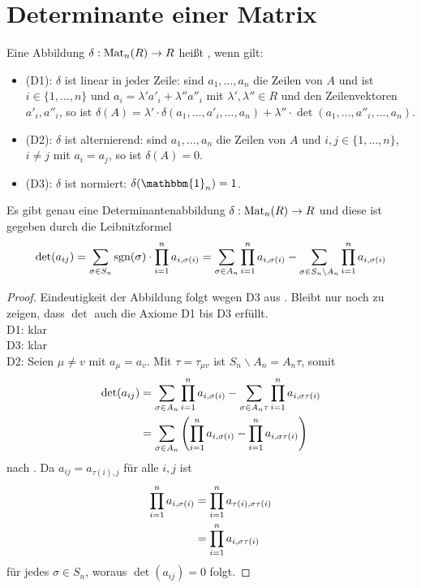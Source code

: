 \section{Determinante einer Matrix}

\begin{definition}[Determinantenabbildung]
	Eine Abbildung $\delta:\operatorname{Mat}_n(R)\to R$ heißt , wenn gilt:
	\begin{itemize}
		\item (D1): $\delta$ ist linear in jeder Zeile: sind $a_1,...,a_n$ die Zeilen von $A$ und ist $i\in \{1,...,n\}$ und $a_i=\lambda'a'_i + 
		\lambda''a''_i$ mit $\lambda',\lambda''\in R$ und den Zeilenvektoren $a'_i,a''_i$, so ist $\delta(A)=\lambda'\cdot \delta(a_1,...,
		a'_i,...,a_n) + \lambda''\cdot \det(a_1,...,a''_i,...,a_n)$.
		\item (D2): $\delta$ ist alternierend: sind $a_1,...,a_n$ die Zeilen von $A$ und $i,j\in \{1,...,n\}$, $i\neq j$ mit $a_i=a_j$, so ist 
		$\delta(A)=0$.
		\item (D3): $\delta$ ist normiert: $\delta(\mathbbm{1}_n)=1$.
	\end{itemize}
\end{definition}

\begin{theorem}
	Es gibt genau eine Determinantenabbildung $\delta:\operatorname{Mat}_n(R)\to R$ und diese ist gegeben durch die 
	Leibnitzformel 
	\begin{align}
		\det(a_{ij})=\sum_{\sigma\in S_n} \operatorname{sgn}(\sigma)\cdot \prod_{i=1}^n a_{i,\sigma(i)} = \sum_{\sigma
			\in A_n}\prod_{i=1}^n a_{i,\sigma(i)} - \sum_{\sigma\in S_n\backslash A_n}\prod_{i=1}^n a_{i,\sigma(i)}\notag
	\end{align}
\end{theorem}
\begin{proof}
	Eindeutigkeit der Abbildung folgt wegen D3 aus . Bleibt nur noch zu zeigen, dass $\det$ auch die Axiome D1 bis D3 erfüllt. \\
	D1: klar \\
	D3: klar \\
	D2: Seien $\mu\neq v$ mit $a_{\mu}=a_v$. Mit $\tau=\tau_{\mu v}$ ist $S_n\backslash A_n = A_n\tau$, somit 
	\begin{align}
		\det(a_{ij})&=
		\sum_{\sigma\in A_n} \prod_{i=1}^n a_{i,\sigma(i)}-\sum_{\sigma\in A_n\tau} \prod_{i=1}^n a_{i,\sigma\tau(i)} \notag \\
		&=
		\sum_{\sigma\in A_n} \left( \prod_{i=1}^n a_{i,\sigma(i)} - \prod_{i=1}^n a_{i,\sigma\tau(i)} \right) \notag
	\end{align}
	nach . Da $a_{ij}=a_{\tau(i),j}$ 
	für alle $i,j$ ist 
	\begin{align}
		\prod_{i=1}^n a_{i,\sigma(i)}&=\prod_{i=1}^n a_{\tau(i),\sigma\tau(i)} \notag \\
		&=\prod_{i=1}^n a_{i,\sigma\tau(i)} \notag
	\end{align}
	für jedes $\sigma\in S_n$, woraus $\det(a_{ij})=0$ folgt.
\end{proof}

